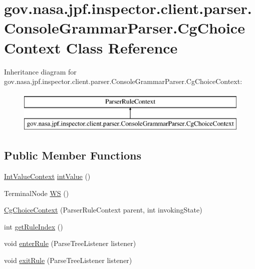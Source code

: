 \hypertarget{classgov_1_1nasa_1_1jpf_1_1inspector_1_1client_1_1parser_1_1_console_grammar_parser_1_1_cg_choice_context}{}\section{gov.\+nasa.\+jpf.\+inspector.\+client.\+parser.\+Console\+Grammar\+Parser.\+Cg\+Choice\+Context Class Reference}
\label{classgov_1_1nasa_1_1jpf_1_1inspector_1_1client_1_1parser_1_1_console_grammar_parser_1_1_cg_choice_context}
Inheritance diagram for gov.\+nasa.\+jpf.\+inspector.\+client.\+parser.\+Console\+Grammar\+Parser.\+Cg\+Choice\+Context\+:\begin{figure}[H]
\begin{center}
\leavevmode
\includegraphics[height=2.000000cm]{classgov_1_1nasa_1_1jpf_1_1inspector_1_1client_1_1parser_1_1_console_grammar_parser_1_1_cg_choice_context}
\end{center}
\end{figure}
\subsection*{Public Member Functions}
\begin{DoxyCompactItemize}
\item 
\hyperlink{classgov_1_1nasa_1_1jpf_1_1inspector_1_1client_1_1parser_1_1_console_grammar_parser_1_1_int_value_context}{Int\+Value\+Context} \hyperlink{classgov_1_1nasa_1_1jpf_1_1inspector_1_1client_1_1parser_1_1_console_grammar_parser_1_1_cg_choice_context_a2dbf4d30b881a37e0bb4ae0e645fad5a}{int\+Value} ()
\item 
Terminal\+Node \hyperlink{classgov_1_1nasa_1_1jpf_1_1inspector_1_1client_1_1parser_1_1_console_grammar_parser_1_1_cg_choice_context_a374c753e92d2f240ff8763dd50b8ed29}{WS} ()
\item 
\hyperlink{classgov_1_1nasa_1_1jpf_1_1inspector_1_1client_1_1parser_1_1_console_grammar_parser_1_1_cg_choice_context_a2a662c809ebfa4abe6117005aec0fd4d}{Cg\+Choice\+Context} (Parser\+Rule\+Context parent, int invoking\+State)
\item 
int \hyperlink{classgov_1_1nasa_1_1jpf_1_1inspector_1_1client_1_1parser_1_1_console_grammar_parser_1_1_cg_choice_context_a17d8dc03b4f9340011b53e941fb1b0e9}{get\+Rule\+Index} ()
\item 
void \hyperlink{classgov_1_1nasa_1_1jpf_1_1inspector_1_1client_1_1parser_1_1_console_grammar_parser_1_1_cg_choice_context_a748439bd1cc5e5e1f7a4e92586f64f50}{enter\+Rule} (Parse\+Tree\+Listener listener)
\item 
void \hyperlink{classgov_1_1nasa_1_1jpf_1_1inspector_1_1client_1_1parser_1_1_console_grammar_parser_1_1_cg_choice_context_a1b8c97ec1d2f75ab044070709e9d9a3e}{exit\+Rule} (Parse\+Tree\+Listener listener)
\end{DoxyCompactItemize}
